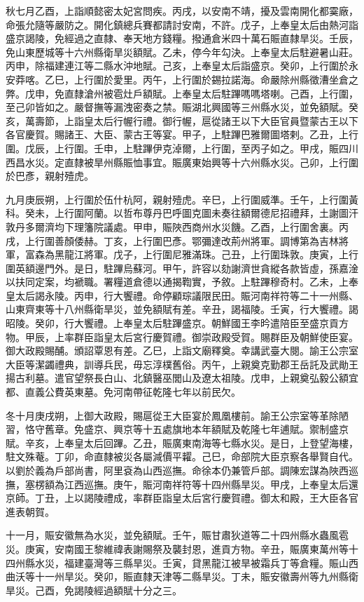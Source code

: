 \begin{pinyinscope}
秋七月乙酉，上詣順懿密太妃宮問疾。丙戌，以安南不靖，擾及雲南開化都霙廠，命張允隨等嚴防之。開化鎮總兵賽都請討安南，不許。戊子，上奉皇太后由熱河詣盛京謁陵，免經過之直隸、奉天地方錢糧。撥通倉米四十萬石賑直隸旱災。壬辰，免山東歷城等十六州縣衛旱災額賦。乙未，停今年勾決。上奉皇太后駐避暑山莊。丙申，除福建連江等二縣水沖地賦。己亥，上奉皇太后詣盛京。癸卯，上行圍於永安莽喀。乙巳，上行圍於愛里。丙午，上行圍於錫拉諾海。命嚴除州縣徵漕坐倉之弊。戊申，免直隸滄州被雹灶戶額賦。上奉皇太后駐蹕嗎嗎塔喇。己酉，上行圍，至己卯皆如之。嚴督撫等漏洩密奏之禁。賑湖北興國等三州縣水災，並免額賦。癸亥，萬壽節，上詣皇太后行幄行禮。御行幄，扈從諸王以下大臣官員暨蒙古王以下各官慶賀。賜諸王、大臣、蒙古王等宴。甲子，上駐蹕巴雅爾圖塔剌。乙丑，上行圍。戊辰，上行圍。壬申，上駐蹕伊克淖爾，上行圍，至丙子如之。甲戌，賑四川西昌水災。定直隸被旱州縣賑恤事宜。賑廣東始興等十六州縣水災。己卯，上行圍於巴彥，親射殪虎。

九月庚辰朔，上行圍於伍什杭阿，親射殪虎。辛巳，上行圍威準。壬午，上行圍黃科。癸未，上行圍阿蘭。以哲布尊丹巴呼圖克圖未奏往額爾德尼招禮拜，土謝圖汗敦丹多爾濟均下理籓院議處。甲申，賑陜西商州水災饑。乙酉，上行圍舍裏。丙戌，上行圍善顏倭赫。丁亥，上行圍巴彥。鄂彌達改荊州將軍。調博第為吉林將軍，富森為黑龍江將軍。戊子，上行圍尼雅滿珠。己丑，上行圍珠敦。庚寅，上行圍英額邊門外。是日，駐蹕烏蘇河。甲午，許容以劾謝濟世貪縱各款皆虛，孫嘉淦以扶同定案，均褫職。署糧道倉德以通揭鞫實，予敘。上駐蹕穆奇村。乙未，上奉皇太后謁永陵。丙申，行大饗禮。命停顧琮議限民田。賑河南祥符等二十一州縣、山東齊東等十八州縣衛旱災，並免額賦有差。辛丑，謁福陵。壬寅，行大饗禮。謁昭陵。癸卯，行大饗禮。上奉皇太后駐蹕盛京。朝鮮國王李昑遣陪臣至盛京貢方物。甲辰，上率群臣詣皇太后宮行慶賀禮。御崇政殿受賀。賜群臣及朝鮮使臣宴。御大政殿賜酺。頒詔覃恩有差。乙巳，上詣文廟釋奠。幸講武臺大閱。諭王公宗室大臣等潔蠲禮典，訓導兵民，毋忘淳樸舊俗。丙午，上親奠克勤郡王岳託及武勛王揚古利墓。遣官望祭長白山、北鎮醫巫閭山及遼太祖陵。戊申，上親奠弘毅公額宜都、直義公費英東墓。免河南帶征乾隆七年以前民欠。

冬十月庚戌朔，上御大政殿，賜扈從王大臣宴於鳳凰樓前。諭王公宗室等革除陋習，恪守舊章。免盛京、興京等十五處旗地本年額賦及乾隆七年逋賦。禦制盛京賦。辛亥，上奉皇太后回蹕。乙丑，賑廣東南海等七縣水災。是日，上登望海樓，駐文殊菴。丁卯，命直隸被災各屬減價平糶。己巳，命部院大臣京察各舉賢自代。以劉於義為戶部尚書，阿里袞為山西巡撫。命徐本仍兼管戶部。調陳宏謀為陜西巡撫，塞楞額為江西巡撫。庚午，賑河南祥符等十四州縣旱災。甲戌，上奉皇太后還京師。丁丑，上以謁陵禮成，率群臣詣皇太后宮行慶賀禮。御太和殿，王大臣各官進表朝賀。

十一月，賑安徽無為水災，並免額賦。壬午，賑甘肅狄道等二十四州縣水蟲風雹災。庚寅，安南國王黎維禕表謝賜祭及襲封恩，進貢方物。辛丑，賑廣東萬州等十四州縣水災，福建臺灣等三縣旱災。壬寅，貸黑龍江被旱被霜兵丁等倉糧。賑山西曲沃等十一州旱災。癸卯，賑直隸天津等二縣旱災。丁未，賑安徽壽州等九州縣衛旱災。己酉，免謁陵經過額賦十分之三。


\end{pinyinscope}
